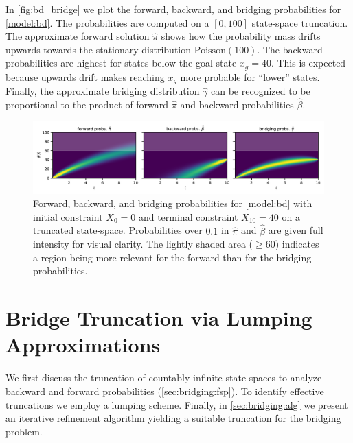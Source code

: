 In \autoref{fig:bd_bridge} we plot the forward, backward, and bridging probabilities for \autoref{model:bd}.
The probabilities are computed on a $[0,100]$ state-space truncation.
The approximate forward solution $\hat\pi$ shows how the probability mass drifts upwards towards the stationary distribution $\text{Poisson}(100)$. The backward probabilities are highest for states below the goal state $x_g=40$.
This is expected because upwards drift makes reaching $x_g$ more probable for ``lower'' states.
Finally, the approximate bridging distribution $\hat\gamma$ can be recognized to be proportional to the product of forward $\hat\pi$ and backward probabilities $\hat\beta$.
\begin{figure}[tb]
    \centering
    \includegraphics[width=\textwidth]{gfx/bridging_bd.pdf}
	\caption[Forward, backward, and bridging probabilities for \autoref{model:bd}]{Forward, backward, and bridging probabilities for \autoref{model:bd} with initial constraint $X_0=0$ and terminal constraint $X_{10}=40$ on a truncated state-space. Probabilities over $0.1$ in $\hat\pi$ and $\hat\beta$ are given full intensity for visual clarity. %
    The lightly shaded area ($\geq 60$) indicates a region being more relevant for the forward than for the bridging probabilities.}
    \label{fig:bd_bridge}
\end{figure}

\section{Bridge Truncation via Lumping Approximations}\label{sec:bridging:method}
We first discuss the truncation of countably infinite state-spaces
to analyze backward and forward probabilities (\autoref{sec:bridging:fsp}).
To identify effective truncations we employ a lumping scheme.
Finally, in \autoref{sec:bridging:alg} we present an iterative refinement algorithm
yielding a suitable truncation for the bridging problem.

